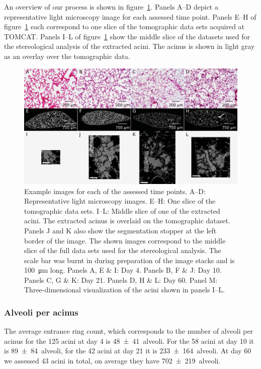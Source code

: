 \documentclass[
  american,
]{article}
\begin{document}
An overview of our process is shown in figure~\ref{fig:01}.
Panels A--D depict a representative light microscopy image for each assessed time point.
Panels E--H of figure~\ref{fig:01} each correspond to one slice of the tomographic data sets acquired at TOMCAT.
Panels I--L of figure~\ref{fig:01} show the middle slice of the datasets used for the stereological analysis of the extracted acini.
The acinus is shown in light gray as an overlay over the tomographic data.

\begin{figure}
\hypertarget{fig:01}{%
\centering
\includegraphics{images/fig01.png}
\caption{Example images for each of the assessed time points.
A--D: Representative light microscopy images.
E--H: One slice of the tomographic data sets.
I--L: Middle slice of one of the extracted acini.
The extracted acinus is overlaid on the tomographic dataset.
Panels J and K also show the segmentation stopper at the left border of the image.
The shown images correspond to the middle slice of the full data sets used for the stereological analysis.
The scale bar was burnt in during preparation of the image stacks and is 100~μm long.
Panels A, E \& I: Day 4.
Panels B, F \& J: Day 10.
Panels C, G \& K: Day 21.
Panels D, H \& L: Day 60.
Panel M: Three-dimensional visualization of the acini shown in panels I--L.}\label{fig:01}
}
\end{figure}

\hypertarget{alveoli-per-acinus}{%
\subsubsection{Alveoli per acinus}\label{alveoli-per-acinus}}

The average entrance ring count, which corresponds to the number of alveoli per acinus for the 125 acini at day 4 is 48~±~41~alveoli.
For the 58 acini at day 10 it is 89~±~84~alveoli, for the 42 acini at day 21 it is 233~±~164~alveoli.
At day 60 we assessed 43 acini in total, on average they have 702~±~219~alveoli.
\end{document}
